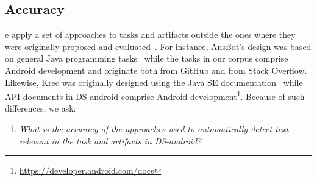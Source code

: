 
 

% 
% 
% 







\subsection{Accuracy}
\label{cp4:relevant-text-accuracy}


\vspace{3mm}



\vspace{3mm}
e apply a set of approaches 
to tasks and artifacts outside the ones where they were originally proposed and evaluated~\cite{nadi2020, Robillard2015, Lotufo2012, Xu2017}.
For instance, \acs{AnsBot}'s design was based on general Java programming tasks~\cite{Xu2017} while the tasks in our corpus comprise Android development and originate both from GitHub and from Stack Overflow. 
Likewise, \acs{Krec} was originally designed using the Java SE documentation~\cite{Robillard2015} 
while API documents in \acs{DS-android} comprise Android development\footnote{\url{https://developer.android.com/docs}}.
Because of such differences, we ask:


\begin{enumerate}[label={},leftmargin=0.7cm]
\item \textit{What is the accuracy of the approaches used to automatically detect text relevant in the task and artifacts in \acs{DS-android}?} 

\end{enumerate}


